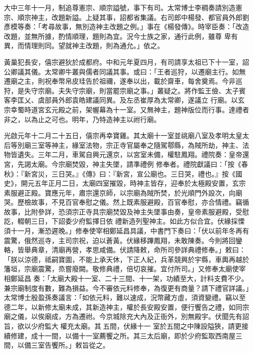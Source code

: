 \begin{pinyinscope}
 大中三年十一月，制追尊憲宗、順宗謚號，事下有司。太常博士李稠奏請別造憲宗、順宗神主，改題新謚。上疑其事，詔都省集議。右司郎中楊發、都官員外郎劉彥模等奏：「考尋故事，無別造神主改題之例。」事在《楊發傳》。時宰臣奏：「改造改題，並無所據，酌情順理，題則為宜。況今士族之家，通行此例，雖尊
 卑有異，而情理則同。望就神主改題，則為通允。」依之。



 黃巢犯長安，僖宗避狄於成都府。中和元年夏四月，有司請享太祖已下十一室，詔公卿議其儀。太常卿牛叢與儒者同議其事。或曰：「王者巡狩，以遷廟主行。如無遷廟之主，則祝奉幣帛皮珪告於祖禰，遂奉以出，載於齋車，每舍奠焉。今非巡狩，是失守宗廟。夫失守宗廟，則當罷宗廟之事。」叢疑之。將作監王儉、太子賓客李匡乂、虞部員外郎袁皓建議同異。及左丞崔厚為太常卿，遂議立
 行廟。以玄宗幸蜀時道宮玄元殿之前，架幄幕為十一室。又無神主，題神版位而行事。達禮者非之，以為止之可也。明年，乃特造神主以祔行廟。



 光啟元年十二月二十五日，僖宗再幸寶雞。其太廟十一室並祧廟八室及孝明太皇太后等別廟三室等神主，緣室法物，宗正寺官屬奉之隨駕鄠縣，為賊所劫，神主、法物皆遺失。三年二月，車駕自興元還京，以宮室未備，權駐鳳翔。禮院奏：皇帝還宮，先謁太廟。今宗廟焚毀，神主失墜，請準禮例
 修奉者。禮院獻議曰：「按《春秋》：『新宮災，三日哭。』《傳》曰：『新宮，宣公廟也。三日哭，禮也。』按《國史》，開元五年正月二日，太廟四室摧毀，時神主皆存，迎奉於太極殿安置，玄宗素服避正殿。寶應元年，肅宗還京師，以宗廟為賊所焚，於光順門外設次，向廟哭。歷檢故事，不見百官奉慰之儀。然上既素服避殿，百官奉慰，亦合情禮。竊循故事，比附參詳，恐須宗正寺具宗廟焚毀及神主失墜事由奏，皇帝素服避殿，受慰訖，輟朝三日，下詔委少府監擇日依
 禮新造列聖神主。如此方似合宜。伏緣採慄須十一月，漸恐遲晚。」修奉使宰相鄭延昌具議，中書門下奏曰：「伏以前年冬再有震驚，俄然巡寺，主司宗祝，迫以蒼黃。伏緣移蹕鳳翔，未敢陳奏。今則將回鑾輅，皆舉典章，清廟再營，孝思咸備。伏請降敕，命所司參詳典禮修奉。」敕曰：「朕以涼德，祗嗣寶圖，不能上承天休，下正人紀，兵革競興於宇縣，車輿再越於籓垣，宗廟震驚，烝嘗廢闕。敬修典禮，倍切哀摧。宜付所司。」又修奉太廟使宰相鄭延昌
 奏：「太廟大殿十一室、二十三間、十一架，功績至大，計料支費不少。兼宗廟制度有數，難為損益。今不審依元料修奉，為復更有商量？請下禮官詳議。」太常博士殷盈孫奏議言：「如依元料，難以速成，況幣藏方虛，須資變禮。竊以至德二年，以新修太廟未成，其新造神主，權於長安殿安置，便行饗告之禮，如同宗廟之儀，以俟廟成，方為遷祔。今京城除充大內及正衙外，別無殿宇。伏聞先有詔旨，欲以少府監大權充太廟。其五間，伏緣十一
 室於五間之中陳設隘狹，請更接續修建，成十一間，以備十一室薦饗之所。其三太后廟，即於少府監取西南屋三間，以備三室告饗所。」敕旨從之。




\end{pinyinscope}
